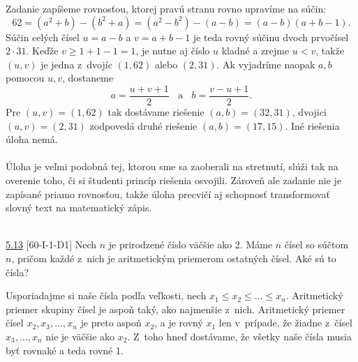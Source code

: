 \rie  Zadanie zapíšeme rovnosťou, ktorej pravú stranu rovno upravíme na súčin: $$62 = (a^2+ b) - (b^2
+ a) = (a^2 - b^2)- (a - b) = (a - b)(a + b - 1).$$
Súčin celých čísel $u = a - b$ a $v = a + b - 1$ je teda rovný súčinu dvoch prvočísel $2 \cdot 31$.
Keďže $v \geq 1 + 1 - 1 = 1$, je nutne aj číslo $u$ kladné a zrejme $u < v$, takže $(u, v)$ je jedna
z~dvojíc $(1, 62)$ alebo $(2, 31)$. Ak vyjadríme naopak $a, b$ pomocou $u, v$, dostaneme $$a =\frac{u+v+1}{2} \ \ \ \  \textrm{a} \ \ \ \  b=\frac{v-u+1}{2}.$$ Pre $(u, v) = (1, 62)$ tak dostávame riešenie $(a, b) = (32, 31)$, dvojici $(u, v) = (2, 31)$ zodpovedá druhé riešenie $(a, b) = (17, 15)$. Iné riešenia úloha nemá.\\
\\
\kom Úloha je veľmi podobná tej, ktorou sme sa zaoberali na stretnutí, slúži tak na overenie toho, či si študenti princíp riešenia osvojili. Zároveň ale zadanie nie je zapísané priamo rovnosťou, takže úloha precvičí aj schopnosť transformovať slovný text na matematický zápis.\\
\\
\begin{tcolorbox}[breakable,notitle,boxrule=0pt,colback=light-gray,colframe=light-gray]\ul{5.13} [60-I-1-D1] Nech $n$ je prirodzené číslo väčšie ako 2. Máme $n$ čísel so súčtom $n$, pričom každé z~nich je aritmetickým priemerom ostatných čísel. Aké sú to čísla?

\end{tcolorbox}

\rieh Usporiadajme si naše čísla podľa veľkosti, nech $x_1 \leq x_2 \leq \ldots \leq x_n$. Aritmetický priemer skupiny čísel je aspoň taký, ako najmenšie z~nich. Aritmetický priemer čísel $x_2, x_3,\ldots , x_n$ je preto aspoň $x_2$, a je rovný $x_1$ len v~prípade, že žiadne z~čísel $x_3, \ldots , x_n$ nie je väčšie ako $x_2$. Z~toho hneď dostávame, že všetky naše čísla musia byť rovnaké a teda rovné 1.
